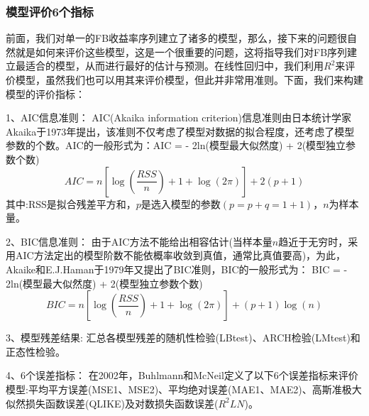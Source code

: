         \subsubsection{模型评价6个指标}
            \par
            前面，我们对单一的FB收益率序列建立了诸多的模型，那么，接下来的问题很自然就是如何来评价这些模型，这是一个很重要的问题，这将指导我们对FB序列建立最适合的模型，从而进行最好的估计与预测。在线性回归中，我们利用$R^2$来评价模型，虽然我们也可以用其来评价模型，但此并非常用准则。下面，我们来构建模型的评价指标：
            \par
            1、AIC信息准则：
            AIC(Akaika information criterion)信息准则由日本统计学家Akaika于1973年提出，该准则不仅考虑了模型对数据的拟合程度，还考虑了模型参数的个数。AIC的一般形式为：AIC = - 2ln(模型最大似然度) + 2(模型独立参数个数)
            \[
            AIC = n\left[ {\log \left( {\frac{{RSS}}{n}} \right) + 1 + \log (2\pi )} \right] + 2(p + 1)
            \]
            其中:RSS是拟合残差平方和，$p$是选入模型的参数$(p=p+q=1+1)$，$n$为样本量。
            \par
            2、BIC信息准则：
            由于AIC方法不能给出相容估计(当样本量$n$趋近于无穷时，采用AIC方法定出的模型阶数不能依概率收敛到真值，通常比真值要高)，为此，Akaike和E.J.Haman于1979年又提出了BIC准则，BIC的一般形式为：
            BIC = - 2ln(模型最大似然度) + 2(模型独立参数个数)
            \[
            BIC = n\left[ {\log \left( {\frac{{RSS}}{n}} \right) + 1 + \log (2\pi )} \right] + (p + 1)\log (n)
            \]
            \par
            3、模型残差结果:
            汇总各模型残差的随机性检验(LBtest)、ARCH检验(LMtest)和正态性检验。
            \par
            4、6个误差指标：
            在2002年，Buhlmann和McNeil定义了以下6个误差指标来评价模型:平均平方误差(MSE1、MSE2)、平均绝对误差(MAE1、MAE2)、高斯准极大似然损失函数误差(QLIKE)及对数损失函数误差($R^2LN $)。
